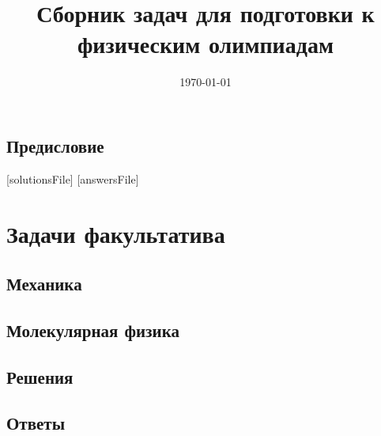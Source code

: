 \documentclass[a5paper, oneside]{book}
\title{Сборник задач для подготовки к физическим олимпиадам}
\date{\today}
\begin{document}
\maketitle
\tableofcontents

\chapter*{Предисловие} 


[solutionsFile]
[answersFile]

\part{Задачи факультатива}

\chapter{Механика}









\chapter{Молекулярная физика}

%
%
%
%
%
%
%


\chapter{Решения}

\chapter{Ответы}
\end{document}

